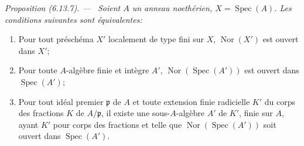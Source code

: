 \documentclass[10pt,oneside]{book}
\newenvironment{proposition}[1][]{%
  \par\medskip\noindent\itshape Proposition (#1). ---\ }{\par}
\begin{document}
\begin{proposition}[6.13.7]
\label{IV.2.s6.13.7-fr}
Soient $A$ un anneau noethérien, $X=\operatorname{Spec}(A)$. Les conditions
suivantes sont équivalentes:
\begin{enumerate}
\item[a)] Pour tout préschéma $X'$ localement de type fini sur $X$,
$\operatorname{Nor}(X')$ est ouvert dans $X'$;
\item[b)] Pour toute $A$-algèbre finie et intègre $A'$,
$\operatorname{Nor}(\operatorname{Spec}(A'))$ est ouvert dans
$\operatorname{Spec}(A')$;
\item[c)] Pour tout idéal premier $\mathfrak p$ de $A$ et toute extension
finie radicielle $K'$ du corps des fractions $K$ de $A/\mathfrak p$, il
existe une sous-$A$-algèbre $A'$ de $K'$, finie sur $A$, ayant $K'$ pour
corps des fractions et telle que $\operatorname{Nor}(\operatorname{Spec}(A'))$
soit ouvert dans $\operatorname{Spec}(A')$.
\end{enumerate}
\end{proposition}
\end{document}
